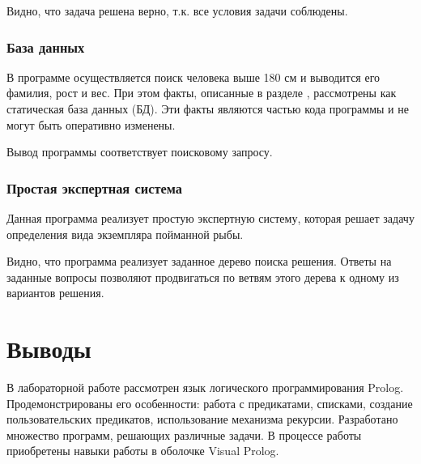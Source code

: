 
Видно, что задача решена верно, т.к. все условия задачи соблюдены.

\subsubsection{База данных}

В программе осуществляется поиск человека выше 180 см и выводится его фамилия, рост и вес. При этом факты, описанные в разделе , рассмотрены как статическая база данных (БД). Эти факты являются частью кода программы и не могут быть оперативно изменены.


Вывод программы соответствует поисковому запросу.

\subsubsection{Простая экспертная система}

Данная программа реализует простую экспертную систему, которая решает задачу определения вида экземпляра пойманной рыбы.


Видно, что программа реализует заданное дерево поиска решения. Ответы на заданные вопросы позволяют продвигаться по ветвям этого дерева к одному из вариантов решения.

\section{Выводы}

В лабораторной работе рассмотрен язык логического программирования Prolog. Продемонстрированы его особенности: работа с предикатами, списками, создание пользовательских предикатов, использование механизма рекурсии. Разработано множество программ, решающих различные задачи. В процессе работы приобретены навыки работы в оболочке Visual Prolog.





